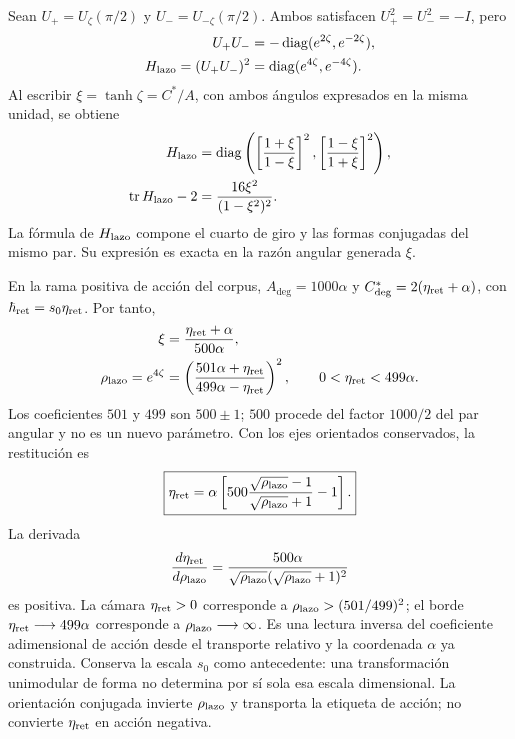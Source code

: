 Sean \(U_+=U_\zeta(\pi/2)\) y
\(U_-=U_{-\zeta}(\pi/2)\). Ambos satisfacen
\(U_+^2=U_-^2=-I\), pero
\begin{equation}
 \begin{aligned}
 U_+U_-&=-\operatorname{diag}(e^{2\zeta},e^{-2\zeta}),\\
 H_{\rm lazo}=(U_+U_-)^2
 &=\operatorname{diag}(e^{4\zeta},e^{-4\zeta}).
 \end{aligned}
 \label{md:comp:lazo-diagonal}
\end{equation}
Al escribir \(\xi=\tanh\zeta=C^*/A\), con ambos ángulos expresados
en la misma unidad, se obtiene
\begin{equation}
 \begin{aligned}
 H_{\rm lazo}
 &=\operatorname{diag}\left(
 \left[\frac{1+\xi}{1-\xi}\right]^2,
 \left[\frac{1-\xi}{1+\xi}\right]^2\right),\\
 \operatorname{tr}H_{\rm lazo}-2
 &=\frac{16\xi^2}{(1-\xi^2)^2}.
 \end{aligned}
 \label{md:comp:lazo-razon-angular}
\end{equation}
La fórmula de \(H_{\rm lazo}\) compone el cuarto de giro y las formas
conjugadas del mismo par. Su expresión es exacta en la razón angular
generada \(\xi\).

En la rama positiva de acción del corpus,
\(A_{\deg}=1000\alpha\) y
\(C^*_{\deg}=2(\eta_{\rm ret}+\alpha)\), con
\(\hbar_{\rm ret}=s_0\eta_{\rm ret}\). Por tanto,
\begin{equation}
 \begin{aligned}
 \xi&=\frac{\eta_{\rm ret}+\alpha}{500\alpha},\\
 \rho_{\rm lazo}=e^{4\zeta}
 &=\left(\frac{501\alpha+\eta_{\rm ret}}
                 {499\alpha-\eta_{\rm ret}}\right)^2,
 \qquad 0<\eta_{\rm ret}<499\alpha.
 \end{aligned}
 \label{md:comp:multiplicador-lazo}
\end{equation}
Los coeficientes \(501\) y \(499\) son \(500\pm1\);
\(500\) procede del factor \(1000/2\) del par angular y no es un
nuevo parámetro. Con los ejes orientados conservados, la restitución es
\begin{equation}
 \boxed{
 \eta_{\rm ret}=\alpha\left[
 500\frac{\sqrt{\rho_{\rm lazo}}-1}
          {\sqrt{\rho_{\rm lazo}}+1}-1\right].}
 \label{md:comp:restitucion-accion}
\end{equation}
La derivada
\[
 \frac{d\eta_{\rm ret}}{d\rho_{\rm lazo}}
 =\frac{500\alpha}
 {\sqrt{\rho_{\rm lazo}}(\sqrt{\rho_{\rm lazo}}+1)^2}
\]
es positiva. La cámara \(\eta_{\rm ret}>0\) corresponde a
\(\rho_{\rm lazo}>(501/499)^2\); el borde
\(\eta_{\rm ret}\longrightarrow499\alpha\) corresponde a
\(\rho_{\rm lazo}\longrightarrow\infty\).
Es una lectura inversa del coeficiente adimensional de acción desde
el transporte relativo y la coordenada \(\alpha\) ya construida.
Conserva la escala \(s_0\) como antecedente: una transformación
unimodular de forma no determina por sí sola esa escala dimensional.
La orientación conjugada invierte \(\rho_{\rm lazo}\) y transporta
la etiqueta de acción; no convierte \(\eta_{\rm ret}\) en acción negativa.

